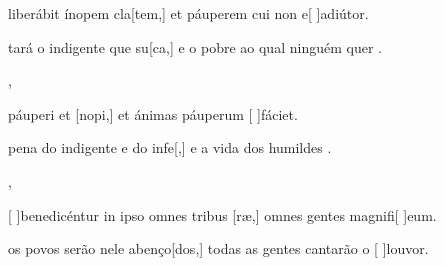 {  {\item {} liberábit ínopem cla[tem,] et páuperem cui non e[ ]{ad}{iú}tor.~\Antiphona}%
    {\item {}tará o indigente que su[ca,] e o pobre ao qual ninguém quer .~\Antiphona},
  {\item {} páuperi et [nopi,] et ánimas páuperum [ ]{fá}ciet.~\Antiphona}%
    {\item {} pena do indigente e do infe[,] e a vida dos humildes .~\Antiphona},
  {\item {}[ ]{be}nedicéntur in ipso omnes tribus [ræ,] omnes gentes magnifi[ ]{e}um.~\Antiphona}%
    {\item {} os povos serão nele abenço[dos,] todas as gentes cantarão o [ ]{lou}{vor}.~\Antiphona}
}